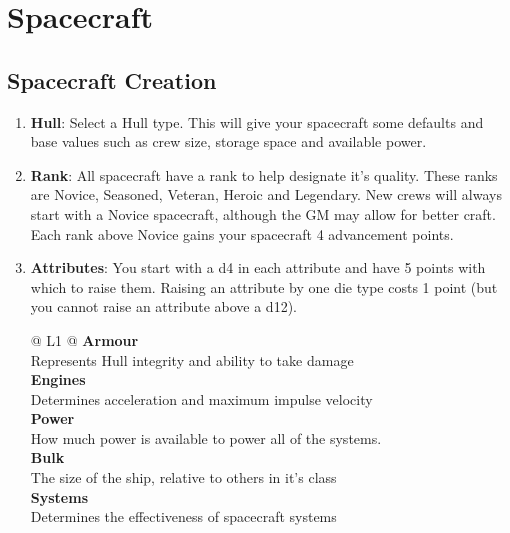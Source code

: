 
\section{Spacecraft}

\begin{multicols}{2}

\subsection{Spacecraft Creation}

\begin{enumerate}

  \item \textbf{Hull}: Select a Hull type. This will give your spacecraft some defaults and base values such as crew size, storage space and available power.
  
  \item \textbf{Rank}: All spacecraft have a rank to help designate it's quality. These ranks are Novice, Seasoned, Veteran, Heroic and Legendary. New crews will always start with a Novice spacecraft, although the GM may allow for better craft. Each rank above Novice gains your spacecraft 4 advancement points.

  \item \textbf{Attributes}: You start with a d4 in each attribute and have 5 points with which to raise them. Raising an attribute by one die type costs 1 point (but you cannot raise an attribute above a d12).

  \begin{redtable}{\linewidth}{ @{} L{1} @{}}
    \textbf{Armour}\\
    Represents Hull integrity and ability to take damage\\
    \textbf{Engines}\\
    Determines acceleration and maximum impulse velocity\\
    \textbf{Power}\\
    How much power is available to power all of the systems.\\
    \textbf{Bulk}\\
    The size of the ship, relative to others in it's class\\
    \textbf{Systems}\\
    Determines the effectiveness of spacecraft systems\\
  \end{redtable}


\end{enumerate}
\end{multicols}
